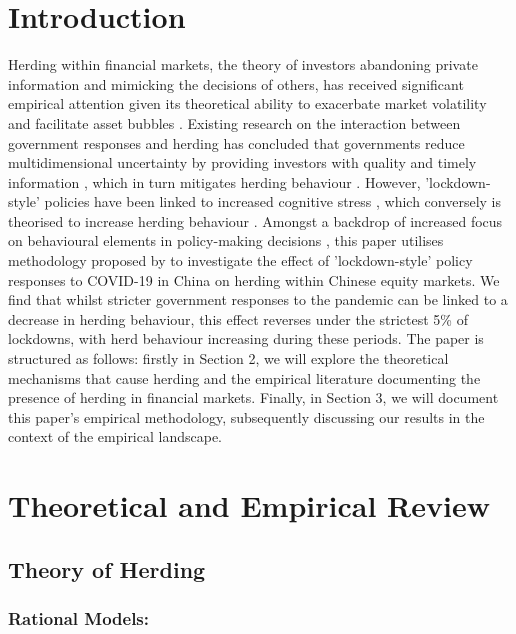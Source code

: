 \documentclass[12pt]{article}
\numberwithin{table}{section}   %
\begin{document}


\tableofcontents
{}
\break

\section{Introduction}

Herding within financial markets, the theory of investors abandoning private information and mimicking the decisions of others, has received significant empirical attention given its theoretical ability to exacerbate market volatility and facilitate asset bubbles \citep{avery}.  Existing research on the interaction between government responses and herding has concluded that governments reduce multidimensional uncertainty by providing investors with quality and timely information \citep{kizys, sharif}, which in turn mitigates herding behaviour \citep{avery}. However, 'lockdown-style' policies  have been linked to increased cognitive stress \citep{dubey, aknin} , which conversely is theorised to increase herding behaviour \citep{pretcher}. Amongst a backdrop of increased focus on  behavioural elements in policy-making decisions \citep{esma}, this paper utilises methodology proposed by \citet{cck} to investigate the effect of 'lockdown-style' policy responses to COVID-19 in China on herding within Chinese equity markets. We find that whilst stricter government responses to the pandemic can be linked to a decrease in herding behaviour, this effect reverses under the strictest 5\% of lockdowns, with herd behaviour increasing during these periods. The paper is structured as follows: firstly in Section 2, we will explore the theoretical mechanisms that cause herding and the empirical literature documenting the presence of herding in financial markets. Finally, in Section 3, we will document this paper's empirical methodology, subsequently discussing our results in the context of the empirical landscape.


\section{Theoretical and Empirical Review}

\subsection{Theory of Herding}

\subsubsection*{Rational Models:}
\end{document}
